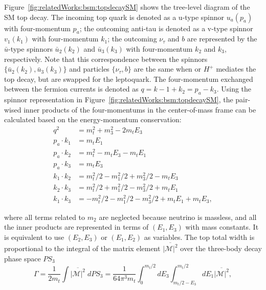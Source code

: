 Figure~\ref{fig:relatedWorks:bsm:topdecaySM} shows the tree-level diagram of the SM top decay. The incoming top quark is denoted as a u-type spinnor $u_a(p_a)$ with four-momentum $p_a$; the outcoming anti-tau is denoted as a v-type spinnor $v_1(k_1)$ with four-momentum $k_1$; the outcoming  $\nu_\tau$ and $b$ are represented by the $\bar{u}$-type spinnors $\bar{u}_2(k_2)$ and $\bar{u}_3(k_3)$ with four-momentum $k_2$ and $k_3$, respectively. Note that this correspondence between the spinnors $\{ \bar{u}_2(k_2), \bar{u}_3(k_3)\}$ and particles $\{\nu_\tau,b\}$ are the same when \PWpr or $H^+$ mediates the top decay, but are swapped for the leptoquark. The four-momentum exchanged between the fermion currents is denoted as $q=k-1+k_2 = p_a - k_3$. Using the spinnor representation in Figure~\ref{fig:relatedWorks:bsm:topdecaySM}, the pair-wised inner products of the four-momentums in the center-of-mass frame can be calculated based on the energy-momentum conservation:
\begin{equation}
\begin{split}
	q^2 &=  m_t^2 + m_3^2  -2 m_t E_3  \\
    p_a \cdot k_1 &= m_t E_1 \\
    p_a \cdot k_2 &= m_t^2  -m_t E_3-m_t E_1  \\
    p_a \cdot k_3 &= m_t E_3 \\
    k_1 \cdot k_2 &= m_t^2/2 - m_1^2/2 + m_3^2/2 - m_t E_3 \\
    k_2\cdot k_3 &=  m_t^2/2 + m_1^2/2 - m_3^2/2 + m_t E_1 \\
    k_1\cdot k_3 &=   -m_t^2/2 - m_1^2/2 - m_3^2/2 + m_t E_1 + m_t E_3 ,
\end{split}
\label{eqn:relatedWorks:bsm:innerProduct}
\end{equation}

\noindent where all terms related to $m_2$ are neglected because neutrino is massless, and all the inner products are represented in terms of $ ( E_1,E_3 )$ with mass constants. It is equivalent to use $ ( E_2,E_3 )$ or $ ( E_1,E_2 )$ as variables. The top total width is proportional to the integral of the matrix element $\overline{ |\mathcal{M}|^2 } $ over the three-body decay phase space $PS_3$
\begin{equation}
	\Gamma = \frac{1}{2 m_t} \int \overline{ |\mathcal{M}|^2 } \; dPS_3 = \frac{1}{64 \pi^3 m_t} \int_{0}^{m_t/2} dE_3 \int_{m_t/2-E_3}^{m_t/2} dE_1 \overline{ |\mathcal{M}|^2 } ,
    \label{eqn:relatedWorks:bsm:decayWidth}
\end{equation}




